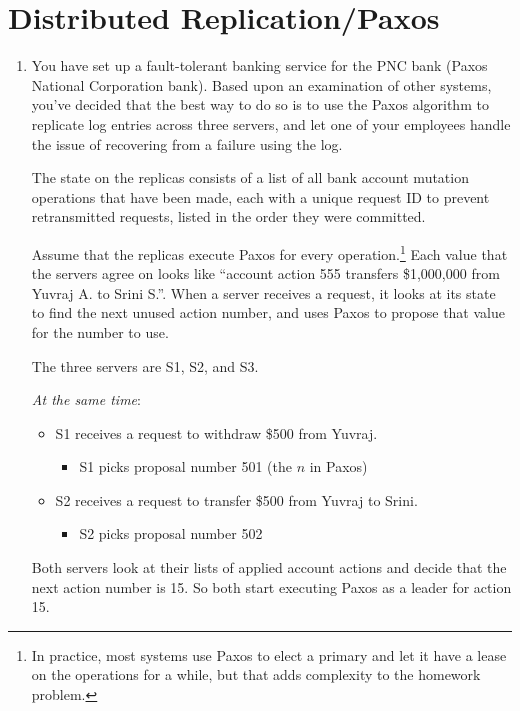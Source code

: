 \documentclass{article}
\begin{document}
\section{Distributed Replication/Paxos}
\begin{enumerate}
\item You have set up a fault-tolerant banking service for the PNC bank (Paxos National Corporation bank).  Based upon an examination of other systems, you've decided that the best way to do so is to use the Paxos algorithm to replicate log entries across three servers, and let one of your employees handle the issue of recovering from a failure using the log.

The state on the replicas consists of a list of all bank account
mutation operations that have been made,
each with a unique request ID to prevent retransmitted requests,
listed in the order they were committed.

Assume that the replicas execute Paxos for every
operation.\footnote{In practice, most systems use Paxos to elect a
  primary and let it have a lease on the operations for a while, but
  that adds complexity to the homework problem.}  Each value that the
servers agree on looks like ``account action 555 transfers \$1,000,000 from
Yuvraj A. to Srini S.''.  When a server receives a request, it looks at its state to find the next unused action number, and uses Paxos to propose that value for the number to use.

The three servers are S1, S2, and S3.

\emph{At the same time}:
\begin{itemize}
  \item S1 receives a request to withdraw \$500 from Yuvraj.
  \begin{itemize}
    \item S1 picks proposal number 501 (the $n$ in Paxos)
  \end{itemize}
  \item S2 receives a request to transfer \$500 from Yuvraj to Srini.
  \begin{itemize}
    \item S2 picks proposal number 502
  \end{itemize}
\end{itemize}

Both servers look at their lists of applied account actions and decide
that the next action number is 15. So both start executing Paxos as a
leader for action 15.\\


\end{enumerate}
\end{document}
